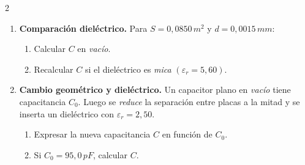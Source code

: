 \documentclass[a4paper,10pt]{article}
\begin{document}
\begin{multicols}{2}
\begin{enumerate}
\item \textbf{Comparación dieléctrico.} Para \(S=0,0850\,\si{m^2}\) y \(d=0,0015\,\si{mm}\):
\begin{enumerate}
\item Calcular \(C\) en \textit{vacío}.
\item Recalcular \(C\) si el dieléctrico es \textit{mica} \(\left(\varepsilon_r=5,60\right)\).
\end{enumerate}

\item \textbf{Cambio geométrico y dieléctrico.} Un capacitor plano en \textit{vacío} tiene capacitancia \(C_0\).
Luego se \emph{reduce} la separación entre placas a la mitad y se inserta un dieléctrico con \(\varepsilon_r=2,50\).
\begin{enumerate}
\item Expresar la nueva capacitancia \(C\) en función de \(C_0\).
\item Si \(C_0=95,0\,\si{pF}\), calcular \(C\).
\end{enumerate}

\end{enumerate}

\end{multicols}
\end{document}
